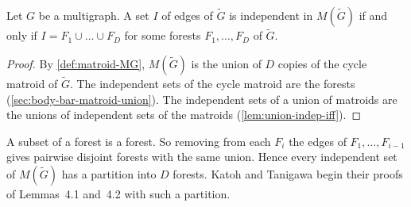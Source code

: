 \begin{lemma}
  \label{lem:forest-packing-decomp}
  \leanok
  Let $G$ be a multigraph. A set $I$ of edges of $\tilde G$ is
  independent in $M(\tilde G)$ if and only if
  $I = F_1 \cup \dots \cup F_D$ for some forests $F_1, \dots, F_D$ of
  $\tilde G$.
\end{lemma}
\begin{proof}
  \leanok
  By \cref{def:matroid-MG}, $M(\tilde G)$ is the union of $D$ copies of
  the cycle matroid of $\tilde G$. The independent sets of the cycle
  matroid are the forests (\cref{sec:body-bar-matroid-union}). The
  independent sets of a union of matroids are the unions of independent
  sets of the matroids (\cref{lem:union-indep-iff}).
\end{proof}

A subset of a forest is a forest. So removing from each $F_i$ the edges
of $F_1, \dots, F_{i-1}$ gives pairwise disjoint forests with the same
union. Hence every independent set of $M(\tilde G)$ has a partition
into $D$ forests. Katoh and Tanigawa begin their proofs of Lemmas~4.1
and~4.2 with such a partition.


